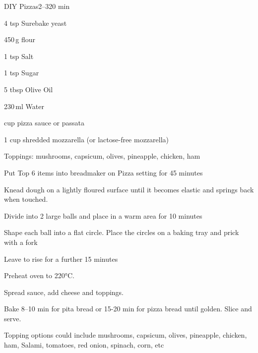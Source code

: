 \begin{recipebox}{DIY Pizzas}{2--3}{20 min}
\begin{ingredients}
  \item 4 tsp Surebake yeast
  \item 450\,g flour
  \item 1 tsp Salt
  \item 1 tsp Sugar
  \item 5 tbsp Olive Oil
  \item 230\,ml Water
  \item {} cup pizza sauce or passata
  \item 1 cup shredded mozzarella (or lactose-free mozzarella)
  \item Toppings: mushrooms, capsicum, olives, pineapple, chicken, ham
\end{ingredients}

\begin{method}
  \item Put Top 6 items into breadmaker on Pizza setting for 45 minutes
  \item Knead dough on a lightly floured surface until it becomes elastic and springs back when touched.
  \item Divide into 2 large balls and place in a warm area for 10 minutes
  \item Shape each ball into a flat circle. Place the circles on a baking tray and prick with a fork
  \item Leave to rise for a further 15 minutes
  \item Preheat oven to 220°C.
  \item Spread sauce, add cheese and toppings.
  \item Bake 8–10 min for pita bread or 15-20 min for pizza bread until golden. Slice and serve.
\end{method}
\begin{notes}
Topping options could include mushrooms, capsicum, olives, pineapple, chicken, ham, Salami, tomatoes, red onion, spinach, corn, etc
\end{notes}
\end{recipebox}

